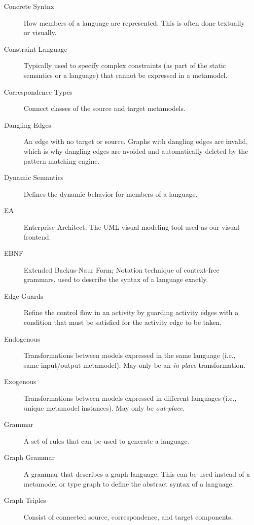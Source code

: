 \begin{description}
\item[Concrete Syntax]
How members of a language are represented. This is often done textually or visually.

\item[Constraint Language] 
Typically used to specify complex constraints (as part of the static semantics or a language) that cannot be expressed in a metamodel.

\item[Correspondence Types] 
Connect classes of the source and target metamodels.

\item[Dangling Edges]
An edge with no target or source. Graphs with dangling edges are invalid, which is why dangling edges are avoided and automatically deleted by the pattern
matching engine.

\item[Dynamic Semantics] 
Defines the dynamic behavior for members of a language.

\item[EA]
Enterprise Architect; The UML visual modeling tool used as our visual frontend.

\item[EBNF] Extended Backus-Naur Form; Notation technique of context-free grammars, used to describe the syntax of a language exactly.

\item[Edge Guards]
Refine the control flow in an activity by guarding activity edges with a condition that must be satisfied for the activity edge to be taken.

\item[Endogenous] Transformations between models expressed in the same language (i.e., same input/output metamodel). May only be an \emph{in-place}
transformation.
 
\item[Exogenous] Transformations between models expressed in different languages (i.e., unique metamodel instances). May only be \emph{out-place}.

\item[Grammar] 
A set of rules that can be used to generate a language. 

\item[Graph Grammar] 
A grammar that describes a graph language. This can be used instead of a metamodel or type graph to define the abstract syntax of a language.

\item[Graph Triples] 
Consist of connected source, correspondence, and target components.


\end{description}
